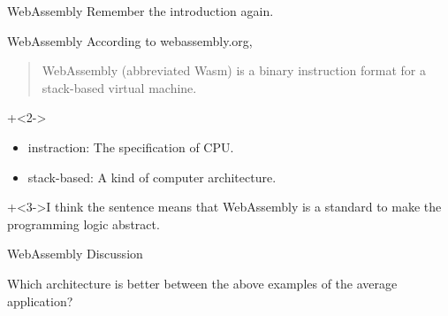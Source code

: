 \begin{frame}{WebAssembly}{}
    Remember the introduction again.
\end{frame}


\begin{frame}{WebAssembly}{}
    According to webassembly.org,
    \begin{quote}WebAssembly (abbreviated Wasm) is a binary instruction format for a stack-based virtual machine.\end{quote}
    \vspace{2ex}

    \onslide+<2->{
        \begin{itemize}
            \item   instraction:    The specification of CPU.
            \item   stack-based:    A kind of computer architecture.
        \end{itemize}
    }
    \vspace{2ex}

    \onslide+<3->{I think the sentence means that WebAssembly is a standard to make the programming logic abstract.}
\end{frame}


\begin{frame}{WebAssembly}{}
    Discussion
    \vspace{4ex}

    Which architecture is better between the above examples of the average application?
\end{frame}
